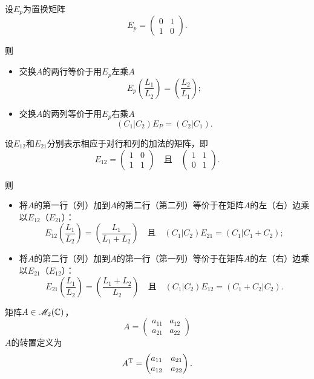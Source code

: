   设$E_p$为{\kaishu 置换矩阵}
  \[
    E_p = \begin{pmatrix}
      0 & 1 \\
      1 & 0
    \end{pmatrix}.
  \]

  则
  \begin{mybox}
    \begin{itemize}
      \item 交换$A$的两行等价于用$E_p$左乘$A$
      \[
        E_p \left( \frac{L_1}{L_2} \right)
        = \left( \frac{L_2}{L_1} \right);
      \]
      \item 交换$A$的两列等价于用$E_p$右乘$A$
      \[
        (C_1|C_2)E_P = (C_2|C_1).
      \]
    \end{itemize}
  \end{mybox}

  设$E_{12}$和$E_{21}$分别表示相应于对行和列的加法的矩阵，即
  \[
    E_{12} = \begin{pmatrix}
      1 & 0 \\
      1 & 1
    \end{pmatrix}\quad \text{且}\quad
    \begin{pmatrix}
      1 & 1 \\
      0 & 1
    \end{pmatrix}.
  \]

  则
  \begin{mybox}
    \begin{itemize}
      \item 将$A$的第一行（列）加到$A$的第二行（第二列）等价于在矩阵$A$的左（右）边乘以$E_{12}$（$E_{21}$）：
          \[
            E_{12} \left( \frac{L_1}{L_2} \right)
            = \left( \frac{L_1}{L_1+L_2} \right)
            \quad \text{且}\quad
            (C_1|C_2)E_{21} = (C_1|C_1 + C_2);
          \]
      \item 将$A$的第二行（列）加到$A$的第一行（第一列）等价于在矩阵$A$的左（右）边乘以$E_{21}$（$E_{12}$）：
          \[
            E_{21} \left( \frac{L_1}{L_2} \right)
            = \left( \frac{L_1+L_2}{L_2} \right)
            \quad \text{且}\quad
            (C_1|C_2)E_{12} = (C_1 + C_2|C_2).
          \]
    \end{itemize}
  \end{mybox}

  \begin{definition}
    矩阵$A\in\mathscr M_2(\mathbb C)$，
    \[
      A = \begin{pmatrix}
        a_{11} & a_{12} \\
        a_{21} & a_{22}
      \end{pmatrix}
    \]
    $A$的{\kaishu 转置}定义为
    \[
      A^{\mathrm T} = \begin{pmatrix}
        a_{11} & a_{21} \\
        a_{12} & a_{22}
      \end{pmatrix}.
    \]
  \end{definition}

